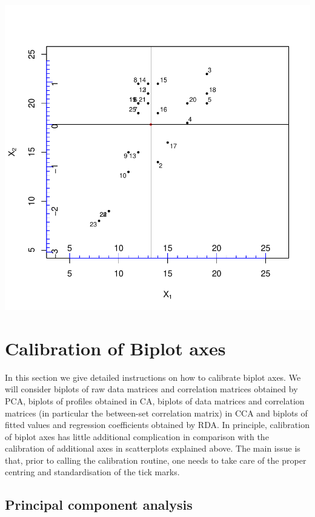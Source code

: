 \documentclass[a4paper]{article}
\begin{document}
\includegraphics{CalibrationGuide-009}

\section{Calibration of Biplot axes}
\label{sec:biplot}

In this section we give detailed instructions on how to calibrate biplot axes. We will consider biplots 
of raw data matrices and correlation matrices obtained by PCA, biplots of profiles obtained in CA,
biplots of data matrices and correlation matrices (in particular the between-set correlation matrix) 
in CCA and biplots of fitted values and regression coefficients obtained by RDA. In principle, calibration
of biplot axes has little additional complication in comparison with the calibration of additional 
axes in scatterplots explained above. The main issue is that, prior to calling the calibration routine,
one needs to take care of the proper centring and standardisation of the tick marks. 

\subsection{Principal component analysis}
\label{sec:pca}
\end{document}
